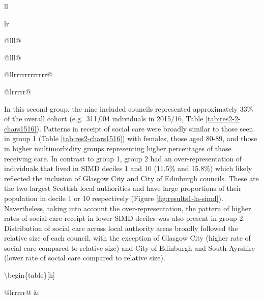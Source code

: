 \documentclass[12pt,a4paper,oneside,table]{report}
\begin{document}
\begin{tabular}[t]{ll}
\begin{tabular}{lr}
{\begin{tabular}{@{}lll@{}}
\begin{tabular}{@{}lll@{}}
\begin{tabular}{@{}llrrrrrrrrrrrr@{}}
{\begin{tabular}{@{}lrrrrr@{}}
{In this second group, the nine included councils represented
approximately 33\% of the overall cohort (e.g.~311,004 individuals in
2015/16, Table \ref{tab:res2-2-chars1516}). Patterns in receipt of
social care were broadly similar to those seen in group 1 (Table
\ref{tab:res2-chars1516}) with females, those aged 80-89, and those in
higher multimorbidity groups representing higher percentages of those
receiving care. In contrast to group 1, group 2 had an
over-representation of individuals that lived in SIMD deciles 1 and 10
(11.5\% and 15.8\%) which likely reflected the inclusion of Glasgow City
and City of Edinburgh councils. These are the two largest Scottish local
authorities and have large proportions of their population in decile 1
or 10 respectively (Figure \ref{fig:results1-la-simd}). Nevertheless,
taking into account the over-representation, the pattern of higher rates
of social care receipt in lower SIMD deciles was also present in group
2. Distribution of social care across local authority areas broadly
followed the relative size of each council, with the exception of
Glasgow City (higher rate of social care compared to relative size) and
City of Edinburgh and South Ayrshire (lower rate of social care compared
to relative size).

\textbackslash begin\{table\}{[}h{]} \footnotesize \centering

\begin{tabular}{@{}lrrrrr@{}}
\toprule
 & 
\end{tabular}}
\end{tabular}}
\end{tabular}
\end{tabular}
\end{tabular}}
\end{tabular}
\end{tabular}
\end{document}
